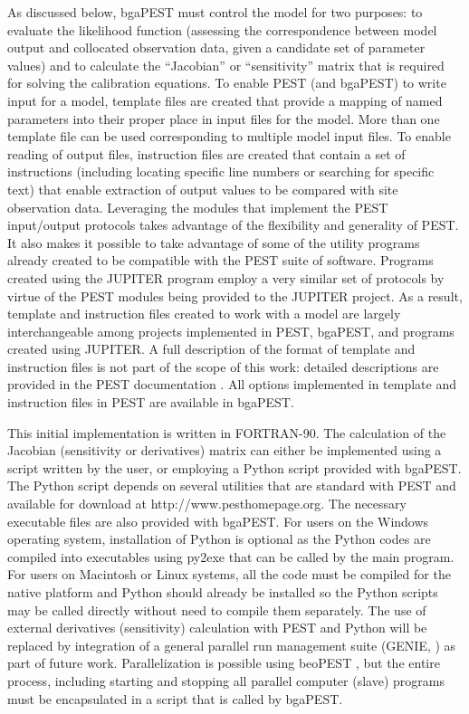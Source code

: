 \documentclass[11pt,oneside,onecolumn]{usgsreport}
\begin{document}
\begin{multicols}{2}
\begin{bibunit}
As discussed below, bgaPEST must control the model for two purposes:
to evaluate the likelihood function (assessing the correspondence
between model output and collocated observation data, given a candidate
set of parameter values) and to calculate the ``Jacobian'' or ``sensitivity''
matrix that is required for solving the calibration equations. To
enable PEST (and bgaPEST) to write input for a model, template files
are created that provide a mapping of named parameters into their
proper place in input files for the model. More than one template
file can be used corresponding to multiple model input files. To enable
reading of output files, instruction files are created that contain
a set of instructions (including locating specific line numbers or
searching for specific text) that enable extraction of output values
to be compared with site observation data. Leveraging the modules
that implement the PEST input/output protocols takes advantage of
the flexibility and generality of PEST. It also makes it possible
to take advantage of some of the utility programs already created
to be compatible with the PEST suite of software. Programs created
using the JUPITER program employ a very similar set of protocols by
virtue of the PEST modules being provided to the JUPITER project.
As a result, template and instruction files created to work with a
model are largely interchangeable among projects implemented in PEST,
bgaPEST, and programs created using JUPITER. A full description of
the format of template and instruction files is not part of the scope
of this work: detailed descriptions are provided in the PEST documentation
\citep[chapter 3]{PEST}. All options implemented in template and
instruction files in PEST are available in bgaPEST.

This initial implementation is written in FORTRAN-90. The calculation
of the Jacobian (sensitivity or derivatives) matrix can either be
implemented using a script written by the user, or employing a Python
script provided with bgaPEST. The Python script depends on several
utilities that are standard with PEST and available for download at
http://www.pesthomepage.org. The necessary executable files are also
provided with bgaPEST. For users on the Windows operating system,
installation of Python is optional as the Python codes are compiled
into executables using py2exe that can be called by the main program.
For users on Macintosh or Linux systems, all the code must be compiled
for the native platform and Python should already be installed so
the Python scripts may be called directly without need to compile
them separately. The use of external derivatives (sensitivity) calculation
with PEST and Python will be replaced by integration of a general
parallel run management suite (GENIE, \citet{GENIE}) as part of future
work. Parallelization is possible using beoPEST \citep{beoPEST},
but the entire process, including starting and stopping all parallel
computer (slave) programs must be encapsulated in a script that is
called by bgaPEST. 



\end{bibunit}
\end{multicols}
\end{document}
